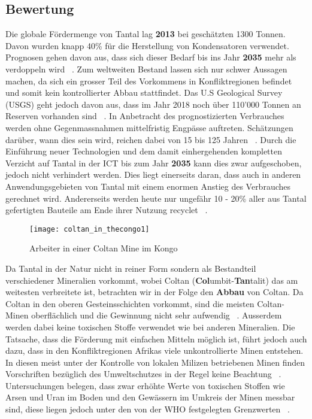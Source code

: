 \subsection{Bewertung}
Die globale Fördermenge von Tantal lag \textbf{2013} bei geschätzten 1300 Tonnen. Davon wurden
knapp 40\% für die Herstellung von Kondensatoren verwendet. Prognosen gehen
davon aus, dass sich dieser Bedarf bis ins Jahr \textbf{2035} mehr als
verdoppeln wird ~\cite{Weltweit69:online}.
Zum  weltweiten Bestand lassen sich nur schwer Aussagen machen, da sich ein grosser
Teil des Vorkommens in Konfliktregionen befindet und somit kein kontrollierter
Abbau stattfindet. Das U.S Geological Survey (USGS) geht jedoch davon aus, dass
im Jahr 2018 noch über 110'000 Tonnen an Reserven vorhanden
sind ~\cite{ober2018mineral}.
In Anbetracht des prognostizierten Verbrauches werden ohne Gegenmassnahmen
mittelfristig Engpässe auftreten. Schätzungen darüber, wann dies sein wird,
reichen dabei von 15 bis 125 Jahren ~\cite{behrendt2007seltene}. Durch die Einführung neuer Technologien und dem
damit einhergehenden kompletten Verzicht auf Tantal in der ICT bis zum Jahr \textbf{2035}  kann dies
zwar aufgeschoben, jedoch nicht verhindert werden. Dies liegt einerseits daran,
dass auch in anderen Anwendungsgebieten von Tantal mit einem enormen Anstieg des
Verbrauches gerechnet wird. Andererseits werden heute nur ungefähr 10 - 20\%
aller aus Tantal gefertigten Bauteile am Ende ihrer Nutzung recyclet ~\cite{behrendt2007seltene}.

\begin{figure}[h]
\centering
\texttt{[image: coltan\_in\_thecongo1]}
\caption{Arbeiter in einer Coltan Mine im Kongo ~\cite{Coltanam17:online}}
\label{}
\end{figure}

Da Tantal in der Natur nicht in reiner Form sondern als Bestandteil verschiedener
Mineralien vorkommt, wobei Coltan (\textbf{Col}umbit-\textbf{Tan}talit) das am
weitesten verbreitete ist, betrachten wir in der Folge den \textbf{Abbau} von Coltan.
Da Coltan in den oberen Gesteinsschichten vorkommt, sind die meisten
Coltan-Minen oberflächlich und die Gewinnung nicht sehr
aufwendig ~\cite{reetsch2008effects}. Ausserdem werden dabei keine toxischen
Stoffe verwendet wie bei anderen Mineralien. Die Tatsache, dass die Förderung
mit einfachen Mitteln möglich ist, führt jedoch auch dazu, dass in den
Konfliktregionen Afrikas viele unkontrollierte Minen entstehen. In diesen meist
unter der Kontrolle von lokalen Milizen betriebenen Minen finden Vorschriften
bezüglich des Umweltschutzes in der Regel keine Beachtung ~\cite{bleischwitz2012coltan}.
Untersuchungen belegen, dass zwar erhöhte Werte von toxischen Stoffen wie Arsen
und Uran im Boden und den Gewässern im Umkreis der Minen messbar sind, diese
liegen jedoch unter den von der WHO festgelegten Grenzwerten ~\cite{environmental_management}.

